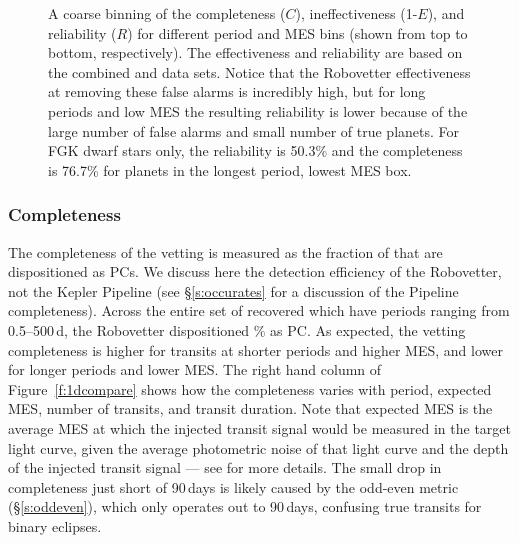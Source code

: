 \begin{figure}[hp]
\begin{center}
\begin{tabular}{c}
\end{tabular}
\caption{A coarse binning of the completeness ($C$), ineffectiveness (1-$E$), and reliability ($R$) for different period and MES bins (shown from top to bottom, respectively). The effectiveness and reliability are based on the combined \invtce{} and \scrtce{} data sets. Notice that the Robovetter effectiveness at removing these false alarms is incredibly high, but for long periods and low MES the resulting reliability is lower because of the large number of false alarms and small number of true planets. For FGK dwarf stars only, the reliability is 50.3\% and the completeness is 76.7\% for planets in the longest period, lowest MES box. }
\label{f:scoregrid}
\end{center}
\end{figure}



\subsubsection{Completeness}
The completeness of the vetting is measured as the fraction of  that are dispositioned as PCs. We discuss here the detection efficiency of the Robovetter, not the Kepler Pipeline (see \S\ref{s:occurates} for a discussion of the Pipeline completeness). Across the entire set of recovered  which have periods ranging from 0.5--500\,d, the Robovetter dispositioned \completeness{}\% as PC. As expected, the vetting completeness is higher for transits at shorter periods and higher MES, and lower for longer periods and lower MES. The right hand column of Figure~\ref{f:1dcompare} shows how the completeness varies with period, expected MES, number of transits, and transit duration. Note that expected MES is the average MES at which the injected transit signal would be measured in the target light curve, given the average photometric noise of that light curve and the depth of the injected transit signal --- see \citealt{Christiansen2017} for more details. The small drop in completeness just short of 90\,days is likely caused by the odd-even metric (\S\ref{s:oddeven}), which only operates out to 90\,days, confusing true transits for binary eclipses.  


